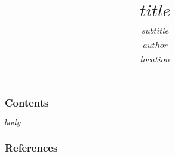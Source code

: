 \documentclass[$if(fontsize)$$fontsize$$else$10pt$endif$, $if(handout)$handout,$endif$ xetex]{beamer}
\title{$title$}
\subtitle{$subtitle$}
\author{$author$}
\institute{$institute$}
\date{$location$}
\date{}
\begin{document}
\begin{frame}[plain]
  \titlepage
\end{frame}

\begin{frame}
  \frametitle{Contents}
	\tableofcontents
\end{frame}

$body$

\frametitle{References}
\end{document}
